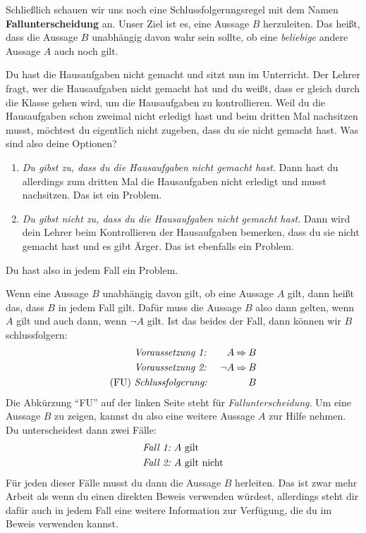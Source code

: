 \documentclass[../../main.tex]{subfiles}
\begin{document}
Schließlich schauen wir uns noch eine Schlussfolgerungsregel mit dem Namen \textbf{Fallunterscheidung} an. Unser Ziel ist es, eine Aussage $B$ herzuleiten. Das heißt, dass die Aussage $B$ unabhängig davon wahr sein sollte, ob eine \emph{beliebige} andere Aussage $A$ auch noch gilt.

\begin{example}{}
    Du hast die Hausaufgaben nicht gemacht und sitzt nun im Unterricht. Der Lehrer fragt, wer die Hausaufgaben nicht gemacht hat und du weißt, dass er gleich durch die Klasse gehen wird, um die Hausaufgaben zu kontrollieren. Weil du die Hausaufgaben schon zweimal nicht erledigt hast und beim dritten Mal nachsitzen musst, möchtest du eigentlich nicht zugeben, dass du sie nicht gemacht hast. Was sind also deine Optionen?
    \begin{enumerate}
        \item \emph{Du gibst zu, dass du die Hausaufgaben nicht gemacht hast.} Dann hast du allerdings zum dritten Mal die Hausaufgaben nicht erledigt und musst nachsitzen. Das ist ein Problem.
        \item \emph{Du gibst nicht zu, dass du die Hausaufgaben nicht gemacht hast.} Dann wird dein Lehrer beim Kontrollieren der Hausaufgaben bemerken, dass du sie nicht gemacht hast und es gibt Ärger. Das ist ebenfalls ein Problem.
    \end{enumerate}
    Du hast also in jedem Fall ein Problem.
\end{example}

Wenn eine Aussage $B$ unabhängig davon gilt, ob eine Aussage $A$ gilt, dann heißt das, dass $B$ in jedem Fall gilt. Dafür muss die Aussage $B$ also dann gelten, wenn $A$ gilt und auch dann, wenn $\lnot A$ gilt. Ist das beides der Fall, dann können wir $B$ schlussfolgern:
\begin{align*}
    &\text{\emph{Voraussetzung~1:}}~&A \mathbin{\Rightarrow} B\\
    &\text{\emph{Voraussetzung~2:}}~&\lnot A \mathbin{\Rightarrow} B\\
    \text{(FU)}~&\text{\emph{Schlussfolgerung:}}~&B
\end{align*}
Die Abkürzung \enquote{FU} auf der linken Seite steht für \emph{Fallunterscheidung}. Um eine Aussage $B$ zu zeigen, kannst du also eine weitere Aussage $A$ zur Hilfe nehmen. Du unterscheidest dann zwei Fälle:
\begin{align*}
    \text{\emph{Fall~1:}}~&A~\text{gilt}\\
    \text{\emph{Fall~2:}}~&A~\text{gilt nicht}
\end{align*}
Für jeden dieser Fälle musst du dann die Aussage $B$ herleiten. Das ist zwar mehr Arbeit als wenn du einen direkten Beweis verwenden würdest, allerdings steht dir dafür auch in jedem Fall eine weitere Information zur Verfügung, die du im Beweis verwenden kannst.
\end{document}
